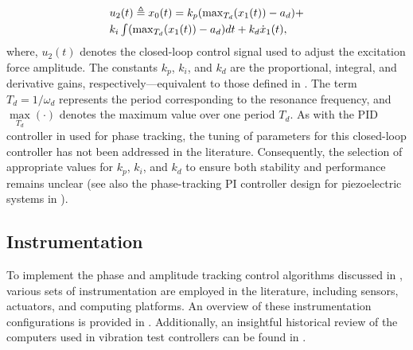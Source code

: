 \documentclass[preprint,12pt]{elsarticle}
\begin{document}
\begin{equation}
\begin{array}{l}
u_2(t) \triangleq x_0(t)=k_{p} (\max_{T_d}(x_1(t))-a_d) + \vspace{0.1cm} \\
k_{i} \int (\max_{T_d}(x_1(t))-a_d) dt + k_d \dot{x}_1(t),
\end{array}
\label{E_PID_amplitude}
\end{equation}
where, $u_2(t)$ denotes the closed-loop control signal used to adjust the excitation force amplitude. The constants $k_p$, $k_i$, and $k_d$ are the proportional, integral, and derivative gains, respectively—equivalent to those defined in . The term $T_d = 1/\omega_d$ represents the period corresponding to the resonance frequency, and $\max\limits_{T_d}(\cdot)$ denotes the maximum value over one period $T_d$. As with the PID controller in  used for phase tracking, the tuning of parameters for this closed-loop controller has not been addressed in the literature. Consequently, the selection of appropriate values for $k_p$, $k_i$, and $k_d$ to ensure both stability and performance remains unclear (see also the phase-tracking PI controller design for piezoelectric systems in \cite{s22176378}).

\subsection{Instrumentation} \label{S_instrumentation}

To implement the phase and amplitude tracking control algorithms discussed in , various sets of instrumentation are employed in the literature, including sensors, actuators, and computing platforms. An overview of these instrumentation configurations is provided in . Additionally, an insightful historical review of the computers used in vibration test controllers can be found in \cite{Computers}.
\end{document}
